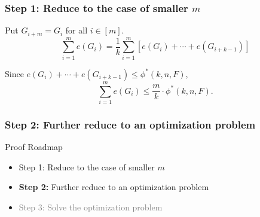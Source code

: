 \documentclass{beamer}
\begin{document}



\begin{frame}
  \frametitle{Step 1: Reduce to the case of smaller $m$}

  Put $G_{i + m} = G_i$ for all $i \in [m]$.
  \[
    \sum_{i = 1}^m e(G_i) 
    = \frac{1}{k}\sum_{i = 1}^m [e(G_i) + \cdots + e(G_{i + k - 1})]
  \]

  \pause

  Since $e(G_i) + \cdots + e(G_{i + k - 1}) \leq \phi^*(k, n, F)$,
  \[
    \sum_{i = 1}^m e(G_i) \leq \frac{m}{k} \cdot \phi^*(k, n, F).
  \]
\end{frame}







  



\begin{frame}
  \frametitle{Step 2: Further reduce to an optimization problem}

  Proof Roadmap

  \begin{itemize}
    \item Step 1: Reduce to the case of smaller $m$
    \item \textbf{Step 2:} Further reduce to an optimization problem
    \item \textcolor{gray}{Step 3: Solve the optimization problem}
  \end{itemize}
\end{frame}
\end{document}
